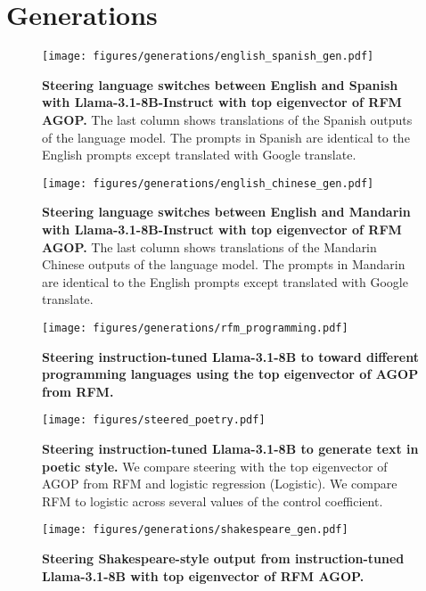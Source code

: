 \section{Generations}
\label{app: generations}

\begin{figure}[h]
    \centering
    \texttt{[image: figures/generations/english\_spanish\_gen.pdf]}
    \caption{\textbf{Steering language switches between English and Spanish with Llama-3.1-8B-Instruct with top eigenvector of RFM AGOP.} The last column shows translations of the Spanish outputs of the language model. The prompts in Spanish are identical to the English prompts except translated with Google translate.}
    \label{fig: english_spanish, llama-3.1-8B}
\end{figure}

\begin{figure}[h]
    \centering
    \texttt{[image: figures/generations/english\_chinese\_gen.pdf]}
    \caption{\textbf{Steering language switches between English and Mandarin with Llama-3.1-8B-Instruct with top eigenvector of RFM AGOP.} The last column shows translations of the Mandarin Chinese outputs of the language model. The prompts in Mandarin are identical to the English prompts except translated with Google translate.}
    \label{fig: english_chinese, llama-3.1-8B}
\end{figure}


\begin{figure}[h]
    \centering
    \texttt{[image: figures/generations/rfm\_programming.pdf]}
    \caption{\textbf{Steering instruction-tuned Llama-3.1-8B to toward different programming languages using the top eigenvector of AGOP from RFM.}}
    \label{fig: programming, llama-3.1-8B}
\end{figure}

\begin{figure}[ht]
    \centering
    \texttt{[image: figures/steered\_poetry.pdf]}

    \caption{\textbf{Steering instruction-tuned Llama-3.1-8B to generate text in poetic style.} We compare steering with the top eigenvector of AGOP from RFM and logistic regression (Logistic). We compare RFM to logistic across several values of the control coefficient.}
    \label{fig: steered poetry style}
\end{figure}

\begin{figure}[h]
    \centering
    \texttt{[image: figures/generations/shakespeare\_gen.pdf]}
    \caption{\textbf{Steering Shakespeare-style output from instruction-tuned Llama-3.1-8B with top eigenvector of RFM AGOP.}}
    \label{fig: shakespeare, llama-3.1-8B}
\end{figure}

